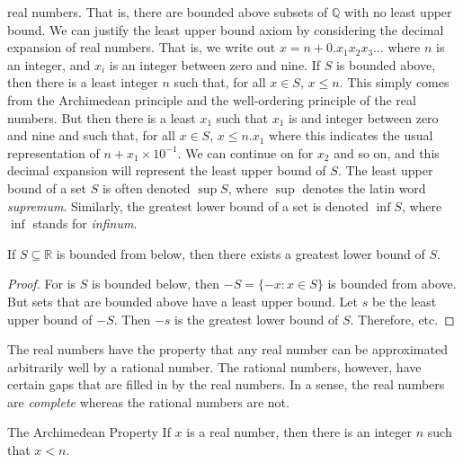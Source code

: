             real numbers. That is, there are bounded above subsets
            of $\mathbb{Q}$ with no least upper bound.
            We can justify the least upper bound axiom by
            considering the decimal expansion of real numbers. That
            is, we write out
            $x=n+0.x_{1}x_{2}x_{3}\dots$ where $n$ is an integer,
            and $x_{i}$ is an integer between zero and nine. If
            $S$ is bounded above, then there is a least integer
            $n$ such that, for all $x\in{S}$, $x\leq{n}$. This
            simply comes from the Archimedean principle and the
            well-ordering principle of the real numbers.
            But then there is a least $x_{1}$ such that $x_{1}$ is
            and integer between zero and nine and such that, for
            all $x\in{S}$, $x\leq{n}.x_{1}$ where this indicates
            the usual representation of
            $n+x_{1}\times{10}^{\minus{1}}$. We can continue on
            for $x_{2}$ and so on, and this decimal expansion
            will represent the least upper bound of $S$. The
            least upper bound of a set $S$ is often denoted
            $\sup{S}$, where $\sup$ denotes the latin word
            \textit{supremum}. Similarly, the greatest lower bound
            of a set is denoted $\inf{S}$, where $\inf$ stands
            for \textit{infinum}.
            \begin{theorem}
                If $S\subseteq\mathbb{R}$ is bounded from below,
                then there exists a greatest lower bound of $S$.
            \end{theorem}
            \begin{proof}
                For is $S$ is bounded below, then
                $\minus{S}=\{\minus{x}:x\in{S}\}$ is bounded
                from above. But sets that are bounded above have
                a least upper bound. Let $s$ be the least upper
                bound of $\minus{S}$. Then $\minus{s}$ is the
                greatest lower bound of $S$. Therefore, etc.
            \end{proof}
            The real numbers have the property that any real
            number can be approximated arbitrarily well by a
            rational number. The rational numbers, however, have
            certain gaps that are filled in by the real numbers.
            In a sense, the real numbers are \textit{complete}
            whereas the rational numbers are not.
            \begin{ltheorem}{The Archimedean Property}
                If $x$ is a real number, then there is an integer
                $n$ such that $x<n$.
            \end{ltheorem}
